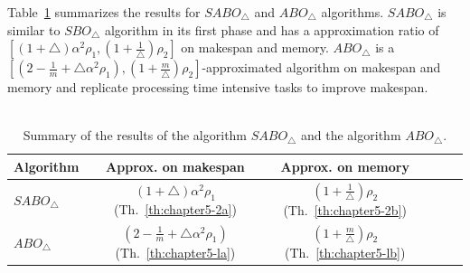 \documentclass[12pt]{article}
\theoremstyle{mystyle}
\begin{document}
                  
     Table~\ref{tab:template2} summarizes the results for $SABO_\triangle$ and $ABO_\triangle$ algorithms. $SABO_\triangle$ is  similar to $ SBO_\triangle$ algorithm in its first phase and has a  approximation ratio of $[(1+\triangle)\alpha^2 \rho_1, (1+\frac{1}{\triangle})\rho_2]$ on makespan and memory.   $ABO_\triangle$ is a $ [(2-\frac{1}{m}+\triangle\alpha^2 \rho_1), (1+\frac{m}{\triangle})\rho_2] $-approximated algorithm on makespan and memory and replicate processing time intensive tasks to improve makespan.\\
     \\
     
     \begin{table}[ht]
         \centering
         \begin{tabular}{|l|c|c|c|c|c|}
           \hline
           Algorithm & Approx. on makespan & Approx. on memory  \\
           \hline
           $SABO_\triangle$&
           $(1+\triangle)\alpha^2 \rho_1$ (Th.~\ref{th:chapter5-2a})& $(1+\frac{1}{\triangle})\rho_2$ (Th.~\ref{th:chapter5-2b})   \\
           \hline
                   $ABO_\triangle$&
                   $(2-\frac{1}{m}+\triangle\alpha^2 \rho_1)$ (Th.~\ref{th:chapter5-la})& $(1+\frac{m}{\triangle})\rho_2$ (Th.~\ref{th:chapter5-lb})   \\
           
           
           
           
           \hline
         \end{tabular}
         \caption{Summary of the results of the algorithm $SABO_\triangle$ and the algorithm $ABO_\triangle$.}
         \label{tab:template2}
       \end{table}
     
\end{document}

